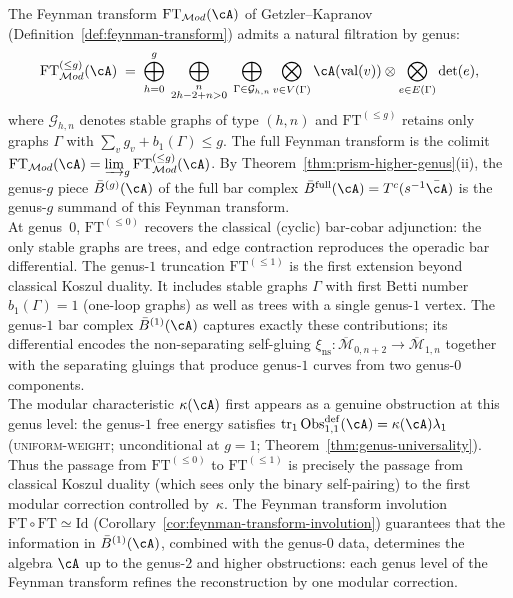 \begin{remark}
\label{rem:ft-genus-one-koszul}
The Feynman transform $\mathrm{FT}_{\mathcal{M}od}(\cA)$
of Getzler--Kapranov~\cite[\S4--5]{GeK98}
(Definition~\ref{def:feynman-transform})
admits a natural filtration by genus:
\[
\mathrm{FT}^{(\leq g)}_{\mathcal{M}od}(\cA)
\;=\;
\bigoplus_{h=0}^{g}
\;\bigoplus_{\substack{n \\ 2h-2+n>0}}
\;\bigoplus_{\substack{\Gamma \in \mathcal{G}_{h,n}}}
\bigotimes_{v \in V(\Gamma)} \cA(\mathrm{val}(v))
\otimes
\bigotimes_{e \in E(\Gamma)} \det(e),
\]
where $\mathcal{G}_{h,n}$ denotes stable graphs of type $(h,n)$
and $\mathrm{FT}^{(\leq g)}$ retains only graphs $\Gamma$
with $\sum_v g_v + b_1(\Gamma) \leq g$.
The full Feynman transform is the colimit
$\mathrm{FT}_{\mathcal{M}od}(\cA)
= \varinjlim_g \mathrm{FT}^{(\leq g)}_{\mathcal{M}od}(\cA)$.
By Theorem~\ref{thm:prism-higher-genus}(ii), the genus-$g$
piece $\bar{B}^{(g)}(\cA)$ of the full bar complex
$\bar{B}^{\mathrm{full}}(\cA) = T^c(s^{-1}\bar{\cA})$
is the genus-$g$ summand of this Feynman transform.
\\
\indent
At genus~$0$, $\mathrm{FT}^{(\leq 0)}$ recovers the
classical (cyclic) bar-cobar adjunction: the only stable graphs
are trees, and edge contraction reproduces the operadic bar
differential.
The genus-$1$ truncation $\mathrm{FT}^{(\leq 1)}$ is the
first extension beyond classical Koszul duality.
It includes stable graphs $\Gamma$ with first Betti number
$b_1(\Gamma) = 1$ (one-loop graphs) as well as trees with a
single genus-$1$ vertex.
The genus-$1$ bar complex $\bar{B}^{(1)}(\cA)$ captures
exactly these contributions; its differential encodes the
non-separating self-gluing
$\xi_{\mathrm{ns}}\colon
\overline{\mathcal{M}}_{0,n+2} \to
\overline{\mathcal{M}}_{1,n}$
together with the separating gluings that produce genus-$1$
curves from two genus-$0$ components.
\\
\indent
The modular characteristic $\kappa(\cA)$ first appears as a
genuine obstruction at this genus level: the genus-$1$ free
energy satisfies
$\operatorname{tr}_1\operatorname{Obs}^{\mathrm{def}}_{1,1}(\cA)
=\kappa(\cA)\lambda_1$
(\textsc{uniform-weight}; unconditional at $g = 1$;
Theorem~\ref{thm:genus-universality}).
Thus the passage from $\mathrm{FT}^{(\leq 0)}$ to
$\mathrm{FT}^{(\leq 1)}$ is precisely the passage from
classical Koszul duality (which sees only the binary
self-pairing) to the first modular correction controlled
by~$\kappa$.
The Feynman transform involution
$\mathrm{FT} \circ \mathrm{FT} \simeq \mathrm{Id}$
(Corollary~\ref{cor:feynman-transform-involution}) guarantees
that the information in $\bar{B}^{(1)}(\cA)$, combined with
the genus-$0$ data, determines the algebra $\cA$ up to the
genus-$2$ and higher obstructions: each genus level of the
Feynman transform refines the reconstruction by one modular
correction.
\end{remark}


